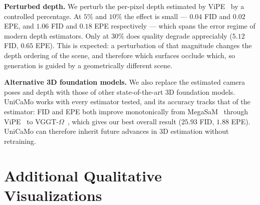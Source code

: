 \noindent\textbf{Perturbed depth.}
We perturb the per-pixel depth estimated by ViPE~\citep{huang2025vipe} by a controlled percentage. At $5\%$ and $10\%$ the effect is small --- $0.04$ FID and $0.02$ EPE, and $1.06$ FID and $0.18$ EPE respectively --- which spans the error regime of modern depth estimators. Only at $30\%$ does quality degrade appreciably ($5.12$ FID, $0.65$ EPE). This is expected: a perturbation of that magnitude changes the depth ordering of the scene, and therefore which surfaces occlude which, so generation is guided by a geometrically different scene.

\noindent\textbf{Alternative 3D foundation models.}
We also replace the estimated camera poses and depth with those of other state-of-the-art 3D foundation models. UniCaMo works with every estimator tested, and its accuracy tracks that of the estimator: FID and EPE both improve monotonically from MegaSaM~\citep{li2025megasam} through ViPE~\citep{huang2025vipe} to VGGT-$\Omega$~\citep{wang2026vggtomega}, which gives our best overall result ($25.93$ FID, $1.88$ EPE). UniCaMo can therefore inherit future advances in 3D estimation without retraining.

\section{Additional Qualitative Visualizations}
\label{sec:supp_qual}




